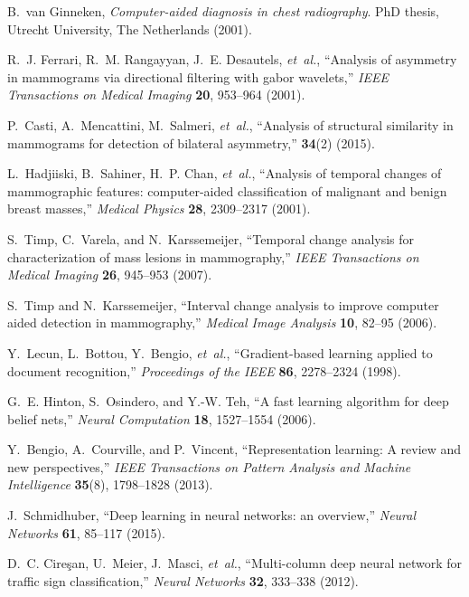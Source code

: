\documentclass[12pt]{spieman}  %
\begin{document}
\begin{thebibliography}{10}
B.~van Ginneken, {\em Computer-aided diagnosis in chest radiography}.
\newblock PhD thesis, Utrecht University, The Netherlands  (2001).

R.~J. Ferrari, R.~M. Rangayyan, J.~E. Desautels, {\em et~al.}, ``Analysis of
  asymmetry in mammograms via directional filtering with gabor wavelets,'' {\em
  IEEE Transactions on Medical Imaging} {\bf 20}, 953--964  (2001).

P.~Casti, A.~Mencattini, M.~Salmeri, {\em et~al.}, ``Analysis of structural
  similarity in mammograms for detection of bilateral asymmetry,''  {\bf 34}(2)
   (2015).

L.~Hadjiiski, B.~Sahiner, H.~P. Chan, {\em et~al.}, ``Analysis of temporal
  changes of mammographic features: computer-aided classification of malignant
  and benign breast masses,'' {\em Medical Physics} {\bf 28}, 2309--2317
  (2001).

S.~Timp, C.~Varela, and N.~Karssemeijer, ``Temporal change analysis for
  characterization of mass lesions in mammography,'' {\em IEEE Transactions on
  Medical Imaging} {\bf 26}, 945--953  (2007).

S.~Timp and N.~Karssemeijer, ``Interval change analysis to improve computer
  aided detection in mammography,'' {\em Medical Image Analysis} {\bf 10},
  82--95  (2006).

Y.~Lecun, L.~Bottou, Y.~Bengio, {\em et~al.}, ``Gradient-based learning applied
  to document recognition,'' {\em Proceedings of the IEEE} {\bf 86}, 2278--2324
   (1998).

G.~E. Hinton, S.~Osindero, and Y.-W. Teh, ``A fast learning algorithm for deep
  belief nets,'' {\em Neural Computation} {\bf 18}, 1527--1554  (2006).

Y.~Bengio, A.~Courville, and P.~Vincent, ``Representation learning: A review
  and new perspectives,'' {\em IEEE Transactions on Pattern Analysis and
  Machine Intelligence} {\bf 35}(8), 1798--1828  (2013).

J.~Schmidhuber, ``Deep learning in neural networks: an overview,'' {\em Neural
  Networks} {\bf 61}, 85--117  (2015).

D.~C. Cire\c{s}an, U.~Meier, J.~Masci, {\em et~al.}, ``Multi-column deep neural
  network for traffic sign classification,'' {\em Neural Networks} {\bf 32},
  333--338  (2012).


\end{thebibliography}
\end{document}
